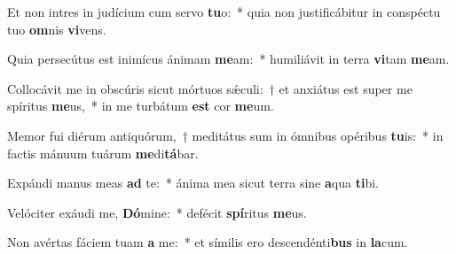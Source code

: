 \item Et non intres in judícium cum servo \textbf{tu}o:~* quia non justificábitur in conspéctu tuo \textbf{om}nis \textbf{vi}vens.
\item Quia persecútus est inimícus ánimam \textbf{me}am:~* humiliávit in terra \textbf{vi}tam \textbf{me}am.
\item Collocávit me in obscúris sicut mórtuos sǽculi:~† et anxiátus est super me spíritus \textbf{me}us,~* in me turbátum \textbf{est} cor \textbf{me}um.
\item Memor fui diérum antiquórum,~† meditátus sum in ómnibus opéribus \textbf{tu}is:~* in factis mánuum tuárum \textbf{me}di\textbf{tá}bar.
\item Expándi manus meas \textbf{ad} te:~* ánima mea sicut terra sine \textbf{a}qua \textbf{ti}bi.
\item Velóciter exáudi me, \textbf{Dó}mine:~* defécit \textbf{spí}ritus \textbf{me}us.
\item Non avértas fáciem tuam \textbf{a} me:~* et símilis ero descendénti\textbf{bus} in \textbf{la}cum.
